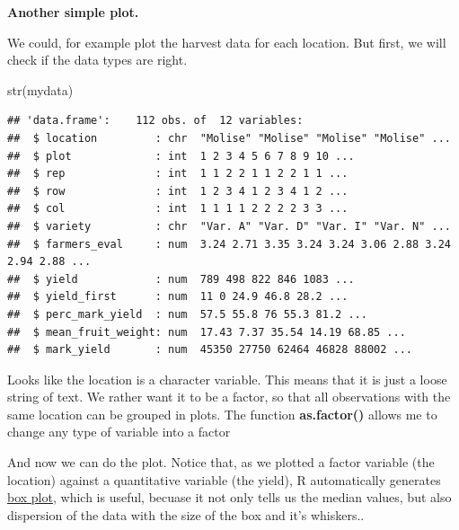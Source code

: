 \documentclass[
]{book}
\newenvironment{Shaded}{\begin{snugshade}}{\end{snugshade}}
\newcommand{\FunctionTok}[1]{\textcolor[rgb]{0.00,0.00,0.00}{#1}}
\newcommand{\NormalTok}[1]{#1}
\newcommand{\OtherTok}[1]{\textcolor[rgb]{0.56,0.35,0.01}{#1}}
\newcommand{\SpecialCharTok}[1]{\textcolor[rgb]{0.00,0.00,0.00}{#1}}
\begin{document}
\textbf{Another simple plot.}

We could, for example plot the harvest data for each location. But first, we will check if the data types are right.

\begin{Shaded}
\begin{Highlighting}[]
\FunctionTok{str}\NormalTok{(mydata)}
\end{Highlighting}
\end{Shaded}

\begin{verbatim}
## 'data.frame':    112 obs. of  12 variables:
##  $ location         : chr  "Molise" "Molise" "Molise" "Molise" ...
##  $ plot             : int  1 2 3 4 5 6 7 8 9 10 ...
##  $ rep              : int  1 1 2 2 1 1 2 2 1 1 ...
##  $ row              : int  1 2 3 4 1 2 3 4 1 2 ...
##  $ col              : int  1 1 1 1 2 2 2 2 3 3 ...
##  $ variety          : chr  "Var. A" "Var. D" "Var. I" "Var. N" ...
##  $ farmers_eval     : num  3.24 2.71 3.35 3.24 3.24 3.06 2.88 3.24 2.94 2.88 ...
##  $ yield            : num  789 498 822 846 1083 ...
##  $ yield_first      : num  11 0 24.9 46.8 28.2 ...
##  $ perc_mark_yield  : num  57.5 55.8 76 55.3 81.2 ...
##  $ mean_fruit_weight: num  17.43 7.37 35.54 14.19 68.85 ...
##  $ mark_yield       : num  45350 27750 62464 46828 88002 ...
\end{verbatim}

Looks like the location is a character variable. This means that it is just a loose string of text. We rather want it to be a factor, so that all observations with the same location can be grouped in plots. The function \textbf{as.factor()} allows me to change any type of variable into a factor

\begin{Shaded}
\end{Shaded}

And now we can do the plot. Notice that, as we plotted a factor variable (the location) against a quantitative variable (the yield), R automatically generates \href{https://en.wikipedia.org/wiki/Box_plot}{box plot}, which is useful, becuase it not only tells us the median values, but also dispersion of the data with the size of the box and it's whiskers..
\end{document}
